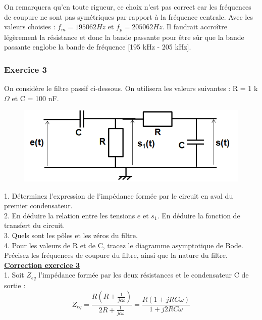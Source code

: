\documentclass[11pt]{report}
\begin{document}
	On remarquera qu'en toute rigueur, ce choix n'est pas correct car les fréquences de coupure ne sont pas symétriques par rapport à la fréquence centrale. Avec les valeurs choisies : $f_{m}=195062 Hz$ et $f_{p}=205062 Hz$. Il faudrait accroître légèrement la résistance et donc la bande passante pour être sûr que la bande passante englobe la bande de fréquence [195 kHz - 205 kHz].
	
	\vspace{1\baselineskip}
	
	
	
	\subsubsection{Exercice 3}
	On considère le filtre passif ci-dessous. On utilisera les valeurs suivantes : R = 1 k$\Omega$ et C = 100 nF.
	
	\begin{figure}[h!]
		\centering
		\includegraphics[scale=0.5]{images/Exo_4_3.png} 
	\end{figure}
	
	
	1. Déterminez l'expression de l'impédance formée par le circuit en aval du premier condensateur.\\
	
	2. En déduire la relation entre les tensions $e$ et $s_1$. En déduire la fonction de transfert du circuit.\\
	
	3. Quels sont les pôles et les zéros du filtre. \\
	
	4. Pour les valeurs de R et de C, tracez le diagramme asymptotique de Bode. Précisez les fréquences de coupure du filtre, ainsi que la nature du filtre.\\

	\textbf{\underline{Correction exercice 3}}\\
	
	1. Soit $Z_{eq}$ l'impédance formée par les deux résistances et le condensateur C de sortie :
	\begin{equation*}
	Z_{eq}=\frac{R(R+\frac{1}{jc\omega})}{2R+\frac{1}{jc\omega}}=\frac{R(1+jRC\omega)}{1+j2RC\omega}
	\end{equation*}	
	
\end{document}
